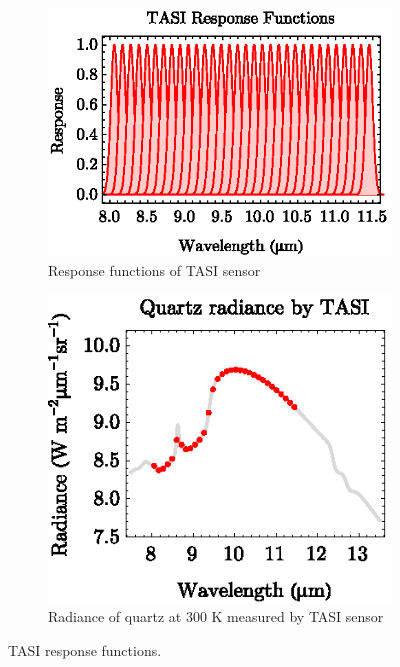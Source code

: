 \begin{figure}[thb]
	\centering
	\vspace{1em}
	\begin{subfigure}[t]{.5\linewidth}
		\centering
		\includegraphics[scale=1]{pics/Chapter_02/TASIResponseFunctions.eps}
		\caption{Response functions of TASI sensor}
		\label{fig:ResponseFunctionsChap2}
	\end{subfigure}
	\hspace{2em}
	\begin{subfigure}[t]{.4\linewidth}
		\centering
		\includegraphics[scale=1]{pics/Chapter_02/QuartzByTASI.eps}
		\caption{Radiance of quartz at 300 K measured by TASI sensor}		
		\label{fig:QuartzByTASIChap2}
	\end{subfigure}
	\vspace{1.5 em}
	\caption{TASI response functions.}
\end{figure}

